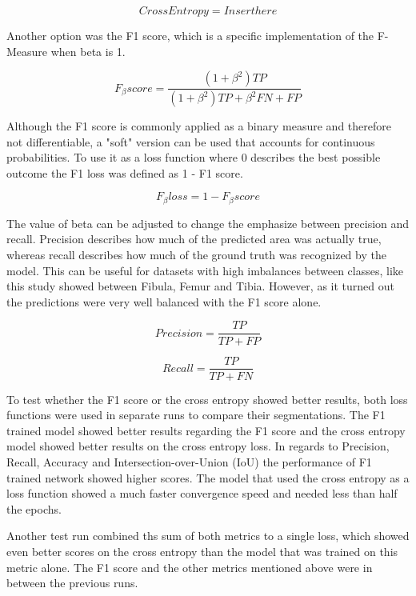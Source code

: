 \begin{equation}
Cross Entropy = Insert here
\end{equation}

Another option was the F1 score, which is a specific implementation of the F-Measure when beta is 1. 

\begin{equation}
F_\beta score= \frac{(1 + \beta^2) TP}{(1+\beta^2)TP+\beta^2FN+FP}
\end{equation}

Although the F1 score is commonly applied as a binary measure and therefore not differentiable, a "soft" version can be used that accounts for continuous probabilities. To use it as a loss function where 0 describes the best possible outcome the F1 loss was defined as 1 - F1 score.

\begin{equation}
F_\beta loss = 1 - F_\beta score
\end{equation}

The value of beta can be adjusted to change the emphasize between precision and recall. Precision describes how much of the predicted area was actually true, whereas recall describes how much of the ground truth was recognized by the model. This can be useful for datasets with high imbalances between classes, like this study showed between Fibula, Femur and Tibia. However, as it turned out the predictions were very well balanced with the F1 score alone.

\begin{equation}
Precision = \frac{TP}{TP+FP}
\end{equation}

\begin{equation}
Recall = \frac{TP}{TP+FN}
\end{equation}

To test whether the F1 score or the cross entropy showed better results, both loss functions were used in separate runs to compare their segmentations. The F1 trained model showed better results regarding the F1 score and the cross entropy model showed better results on the cross entropy loss. In regards to Precision, Recall, Accuracy and Intersection-over-Union (IoU) the performance of F1 trained network showed higher scores. The model that used the cross entropy as a loss function showed a much faster convergence speed and needed less than half the epochs. 

Another test run combined ths sum of both metrics to a single loss, which showed even better scores on the cross entropy than the model that was trained on this metric alone. The F1 score and the other metrics mentioned above were in between the previous runs.

